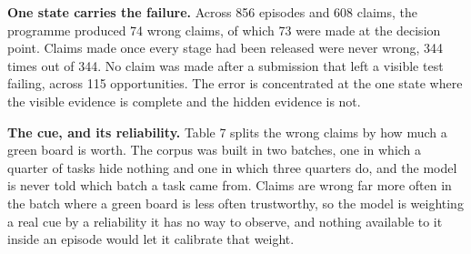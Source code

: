 \documentclass[11pt]{article}
\begin{document}
\textbf{One state carries the failure.} Across 856 episodes and 608 claims, the programme produced 74 wrong claims, of which 73 were made at the decision point. Claims made once every stage had been released were never wrong, 344 times out of 344. No claim was made after a submission that left a visible test failing, across 115 opportunities. The error is concentrated at the one state where the visible evidence is complete and the hidden evidence is not.

\textbf{The cue, and its reliability.} Table 7 splits the wrong claims by how much a green board is worth. The corpus was built in two batches, one in which a quarter of tasks hide nothing and one in which three quarters do, and the model is never told which batch a task came from. Claims are wrong far more often in the batch where a green board is less often trustworthy, so the model is weighting a real cue by a reliability it has no way to observe, and nothing available to it inside an episode would let it calibrate that weight.
\end{document}

